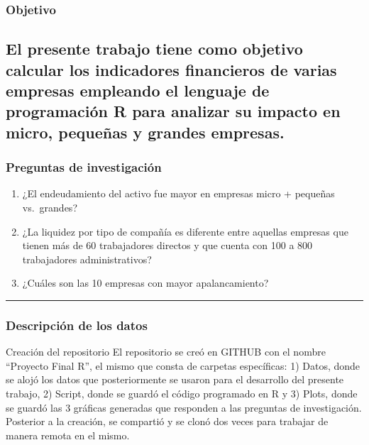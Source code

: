 \documentclass[
]{article}
\providecommand{\tightlist}{%
  \setlength{\itemsep}{0pt}\setlength{\parskip}{0pt}}
\begin{document}
\hypertarget{objetivo}{%
\subsubsection{Objetivo}\label{objetivo}}

\hypertarget{el-presente-trabajo-tiene-como-objetivo-calcular-los-indicadores-financieros-de-varias-empresas-empleando-el-lenguaje-de-programaciuxf3n-r-para-analizar-su-impacto-en-micro-pequeuxf1as-y-grandes-empresas.}{%
\subsection{El presente trabajo tiene como objetivo calcular los
indicadores financieros de varias empresas empleando el lenguaje de
programación R para analizar su impacto en micro, pequeñas y grandes
empresas.}\label{el-presente-trabajo-tiene-como-objetivo-calcular-los-indicadores-financieros-de-varias-empresas-empleando-el-lenguaje-de-programaciuxf3n-r-para-analizar-su-impacto-en-micro-pequeuxf1as-y-grandes-empresas.}}

\hypertarget{preguntas-de-investigaciuxf3n}{%
\subsubsection{Preguntas de
investigación}\label{preguntas-de-investigaciuxf3n}}

\begin{enumerate}
\def\labelenumi{\arabic{enumi}.}
\tightlist
\item
  ¿El endeudamiento del activo fue mayor en empresas micro + pequeñas
  vs.~grandes?
\item
  ¿La liquidez por tipo de compañía es diferente entre aquellas empresas
  que tienen más de 60 trabajadores directos y que cuenta con 100 a 800
  trabajadores administrativos?
\item
  ¿Cuáles son las 10 empresas con mayor apalancamiento?
\end{enumerate}

\begin{center}\rule{0.5\linewidth}{0.5pt}\end{center}

\hypertarget{descripciuxf3n-de-los-datos}{%
\subsubsection{Descripción de los
datos}\label{descripciuxf3n-de-los-datos}}

Creación del repositorio El repositorio se creó en GITHUB con el nombre
``Proyecto Final R'', el mismo que consta de carpetas específicas: 1)
Datos, donde se alojó los datos que posteriormente se usaron para el
desarrollo del presente trabajo, 2) Script, donde se guardó el código
programado en R y 3) Plots, donde se guardó las 3 gráficas generadas que
responden a las preguntas de investigación. Posterior a la creación, se
compartió y se clonó dos veces para trabajar de manera remota en el
mismo.
\end{document}
